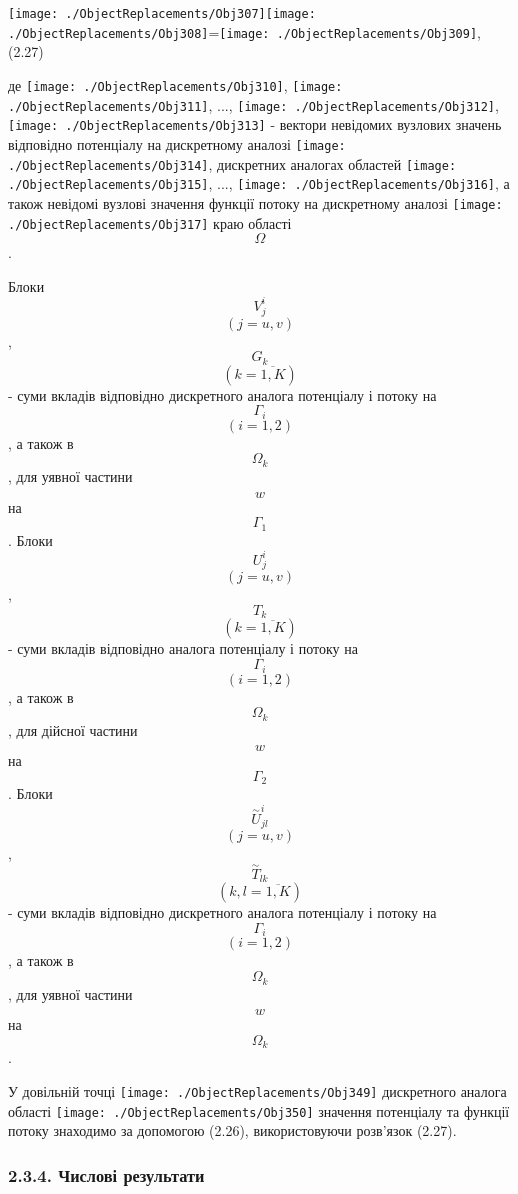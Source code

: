 \texttt{[image: ./ObjectReplacements/Obj307]}\texttt{[image: ./ObjectReplacements/Obj308]}=\texttt{[image: ./ObjectReplacements/Obj309]},(2.27)

де
\texttt{[image: ./ObjectReplacements/Obj310]},
\texttt{[image: ./ObjectReplacements/Obj311]},
...,
\texttt{[image: ./ObjectReplacements/Obj312]},
\texttt{[image: ./ObjectReplacements/Obj313]}
- вектори невідомих вузлових значень відповідно потенціалу на
дискретному аналозі
\texttt{[image: ./ObjectReplacements/Obj314]},
дискретних аналогах областей
\texttt{[image: ./ObjectReplacements/Obj315]},
...,
\texttt{[image: ./ObjectReplacements/Obj316]},
а також невідомі вузлові значення функції потоку на дискретному аналозі
\texttt{[image: ./ObjectReplacements/Obj317]}
краю області\[\Omega{}\].

Блоки \[V_{j}^{i}{}\] \[\left( {{j = u},v} \right){}\], \[G_{k}{}\]
\[\left( {k = \overline{1,K}} \right){}\] - суми вкладів відповідно
дискретного аналога потенціалу і потоку на \[\]\[\Gamma_{i}{}\]
\[\left( {i = 1,2} \right){}\], а також в \[\Omega_{k}{}\], для уявної
частини \[\hat{w}{}\] на \[\Gamma_{1}{}\]. Блоки \[U_{j}^{i}{}\]
\[\left( {{j = u},v} \right){}\], \[T_{k}{}\]
\[\left( {k = \overline{1,K}} \right){}\] - суми вкладів відповідно
аналога потенціалу і потоку на \[\]\[\Gamma_{i}{}\]
\[\left( {i = 1,2} \right){}\], а також в \[\Omega_{k}{}\], для дійсної
частини \[\hat{w}{}\] на \[\Gamma_{2}{}\]. Блоки
\[{\overset{\sim}{U}}_{\mathit{\text{jl}}}^{i}{}\]
\[\left( {{j = u},v} \right){}\],
\[{\overset{\sim}{T}}_{\mathit{\text{lk}}}{}\]
\[\left( {k,{l = \overline{1,K}}} \right){}\] - суми вкладів відповідно
дискретного аналога потенціалу і потоку на \[\]\[\Gamma_{i}{}\]
\[\left( {i = 1,2} \right){}\], а також в \[\Omega_{k}{}\], для уявної
частини \[\hat{w}{}\] на \[\Omega_{k}{}\].

У довільній точці
\texttt{[image: ./ObjectReplacements/Obj349]}
дискретного аналога області
\texttt{[image: ./ObjectReplacements/Obj350]}
значення потенціалу та функції потоку знаходимо за допомогою (2.26),
використовуючи розв'язок (2.27).

\hypertarget{ux447ux438ux441ux43bux43eux432ux456-ux440ux435ux437ux443ux43bux44cux442ux430ux442ux438-1}{%
\subsubsection[2.3.4. Числові
результати]{\texorpdfstring{\protect\hypertarget{anchor-42}{}{}2.3.4.
Числові
результати}{2.3.4. Числові результати}}\label{ux447ux438ux441ux43bux43eux432ux456-ux440ux435ux437ux443ux43bux44cux442ux430ux442ux438-1}}

